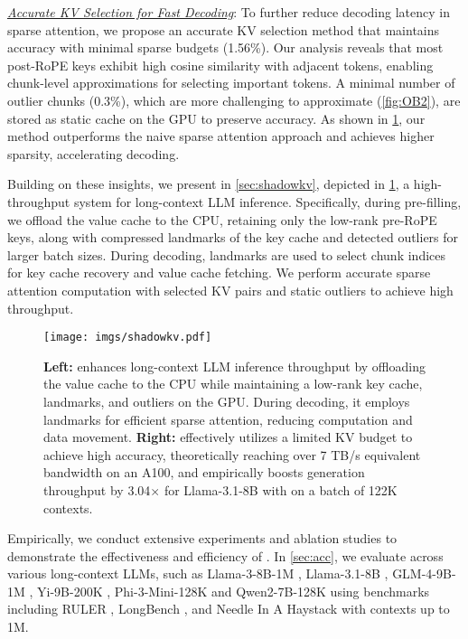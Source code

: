 \underline{\textit{Accurate KV Selection for Fast Decoding}}: To further reduce decoding latency in sparse attention, we propose an accurate KV selection method that maintains accuracy with minimal sparse budgets (1.56\%). Our analysis reveals that most post-RoPE keys exhibit high cosine similarity with adjacent tokens, enabling chunk-level approximations for selecting important tokens. A minimal number of outlier chunks (0.3\%), which are more challenging to approximate  (\cref{fig:OB2}), are stored as static cache on the GPU to preserve accuracy. As shown in \cref{fig:shadowkv}, our method outperforms the naive sparse attention approach \citep{tang2024quest} and achieves higher sparsity, accelerating decoding.

Building on these insights, we present \Sys in \cref{sec:shadowkv}, depicted in \cref{fig:shadowkv}, a high-throughput system for long-context LLM inference. Specifically, during pre-filling, we offload the value cache to the CPU, retaining only the low-rank pre-RoPE keys, along with compressed landmarks of the key cache and detected outliers for larger batch sizes. During decoding, landmarks are used to select chunk indices for key cache recovery and value cache fetching. We perform accurate sparse attention computation with selected KV pairs and static outliers to achieve high throughput.

 \begin{figure}[t]
    \centering
    \texttt{[image: imgs/shadowkv.pdf]}
    \caption{\textbf{Left:} \Sys enhances long-context LLM inference throughput by offloading the value cache to the CPU while maintaining a low-rank key cache, landmarks, and outliers on the GPU. During decoding, it employs landmarks for efficient sparse attention, reducing computation and data movement. \textbf{Right:} \Sys effectively utilizes a limited KV budget to achieve high accuracy, theoretically reaching over 7 TB/s equivalent bandwidth on an A100, and empirically boosts generation throughput by 3.04$\times$ for Llama-3.1-8B with on a batch of 122K contexts.}
    \label{fig:shadowkv}
\end{figure}

Empirically, we conduct extensive experiments and ablation studies to demonstrate the effectiveness and efficiency of \Sys. In \cref{sec:acc}, we evaluate across various long-context LLMs, such as Llama-3-8B-1M \citep{gradllama}, Llama-3.1-8B \citep{meta_llama_3_1}, GLM-4-9B-1M \citep{glm2024chatglm}, Yi-9B-200K \citep{ai2024yi}, Phi-3-Mini-128K \citep{abdin2024phi} and Qwen2-7B-128K \citep{yang2024qwen2} using benchmarks including RULER \citep{hsieh2024ruler},  LongBench \citep{bai2023longbench}, and Needle In A Haystack \citep{niah} with contexts up to 1M.

